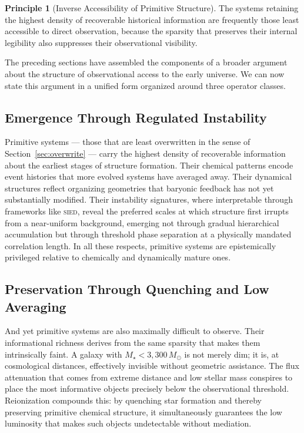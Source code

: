 \documentclass[12pt, a4paper]{article}
\newcommand{\Msun}{M_{\odot}}
\newcommand{\Mstar}{M_{\star}}
\newcommand{\SIED}{\textsc{sied}}
\theoremstyle{definition}
\newtheorem{principle}{Principle}
\begin{document}
\begin{principle}[Inverse Accessibility of Primitive Structure]
The systems retaining the highest density of recoverable historical
information are frequently those least accessible to direct observation,
because the sparsity that preserves their internal legibility also suppresses
their observational visibility.
\end{principle}

The preceding sections have assembled the components of a broader argument
about the structure of observational access to the early universe. We can
now state this argument in a unified form organized around three operator
classes.

\subsection{Emergence Through Regulated Instability}

Primitive systems --- those that are least overwritten in the sense of
Section~\ref{sec:overwrite} --- carry the highest density of recoverable
information about the earliest stages of structure formation. Their chemical
patterns encode event histories that more evolved systems have averaged away.
Their dynamical structures reflect organizing geometries that baryonic
feedback has not yet substantially modified. Their instability signatures,
where interpretable through frameworks like \SIED{}, reveal the preferred
scales at which structure first irrupts from a near-uniform background,
emerging not through gradual hierarchical accumulation but through threshold
phase separation at a physically mandated correlation length. In all these
respects, primitive systems are epistemically privileged relative to
chemically and dynamically mature ones.

\subsection{Preservation Through Quenching and Low Averaging}

And yet primitive systems are also maximally difficult to observe. Their
informational richness derives from the same sparsity that makes them
intrinsically faint. A galaxy with $\Mstar < 3{,}300\,\Msun$ is not merely
dim; it is, at cosmological distances, effectively invisible without geometric
assistance. The flux attenuation that comes from extreme distance and low
stellar mass conspires to place the most informative objects precisely below
the observational threshold. Reionization compounds this: by quenching star
formation and thereby preserving primitive chemical structure, it
simultaneously guarantees the low luminosity that makes such objects
undetectable without mediation.
\end{document}
